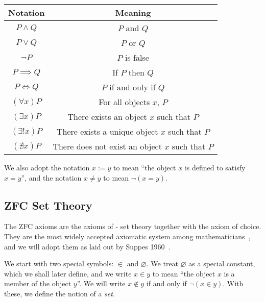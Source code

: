 \documentclass[a4paper,11pt]{article}
\theoremstyle{plain}
\theoremstyle{definition}
\theoremstyle{remark}
\begin{document}
\begin{center}
\begin{tabular}{||c c||} 
 \hline
 Notation & Meaning \\
 \hline\hline
 $P \land Q$ & $P$ and $Q$ \\ 
 \hline
 $P \lor Q$ & $P$ or $Q$ \\
 \hline
 $\lnot P$ & $P$ is false \\
 \hline
 $P \implies Q$ & If $P$ then $Q$ \\
 \hline
 $P \iff Q$ & $P$ if and only if $Q$ \\
 \hline
 $(\forall x)P$ & For all objects $x$, $P$ \\
 \hline
 $(\exists x)P$ & There exists an object $x$ such that $P$ \\
 \hline
 $(\exists! x)P$ & There exists a unique object $x$ such that $P$ \\
 \hline
 $(\nexists x)P$ & There does not exist an object $x$ such that $P$ \\
 \hline
\end{tabular}
\end{center}

We also adopt the notation $x := y$ to mean ``the object $x$ is defined to satisfy $x = y$'', and the notation $x \neq y$ to mean $\lnot (x=y)$.

\subsection{ZFC Set Theory}
\label{subsec:ZFC}
The ZFC axioms are the axioms of \citeauthor{Zermelo1908}-\citeauthor{Fraenkel1922} set theory together with the axiom of choice. They are the most widely accepted axiomatic system among mathematicians~\cite[p.~4]{Ciesielski1997}, and we will adopt them as laid out by Suppes 1960~\citep{SuppesBook}.

We start with two special symbols: $\in$ and $\varnothing$. We treat $\varnothing$ as a special constant, which we shall later define, and we write $x \in y$ to mean ``the object $x$ is a member of the object $y$''. We will write $x\notin y$ if and only if $\lnot (x\in y)$. With these, we define the notion of a \textit{set}.
\end{document}

